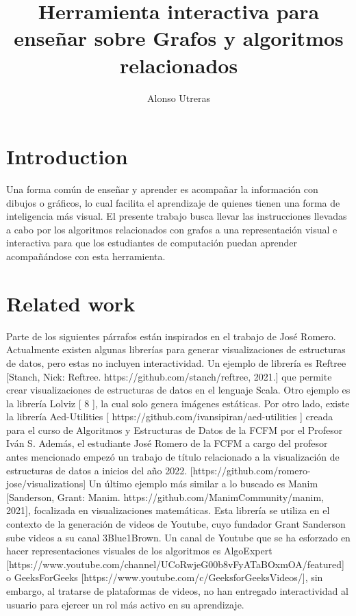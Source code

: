 \documentclass[submission]{eptcs}
\title{Herramienta interactiva para enseñar sobre Grafos y algoritmos relacionados}
\author{ Alonso Utreras
\institute{Department of Computer Science\\
University of Chile\\
Santiago, Chile}
\email{alonso.utreras@ug.uchile.cl}
\email{autreras@dcc.uchile.cl}
}
\begin{document}
\maketitle

\section{Introduction}
 
Una forma común de enseñar y aprender es acompañar la información con dibujos o gráficos, lo cual
facilita el aprendizaje de quienes tienen una forma de inteligencia más visual. El presente trabajo
busca llevar las instrucciones llevadas a cabo por los algoritmos relacionados con grafos a una
representación visual e interactiva para que los estudiantes de computación puedan aprender acompañándose
con esta herramienta.

\section{Related work}

Parte de los siguientes párrafos están inspirados en el trabajo de José Romero.
Actualmente existen algunas librerías para generar visualizaciones de estructuras de
datos, pero estas no incluyen interactividad. Un ejemplo de librería es Reftree [Stanch, Nick: Reftree.
https://github.com/stanch/reftree, 2021.] que permite crear visualizaciones de estructuras de datos en
el lenguaje Scala.
Otro ejemplo es la librería Lolviz [ 8 ], la cual solo genera imágenes estáticas.
Por otro lado, existe la librería Aed-Utilities [ https://github.com/ivansipiran/aed-utilities ] creada para el curso de Algoritmos
y Estructuras de Datos de la FCFM por el Profesor Iván S.
Además, el estudiante José Romero de la FCFM a cargo del profesor antes mencionado
empezó un trabajo de título relacionado a la visualización de estructuras de datos
a inicios del año 2022. [https://github.com/romero-jose/visualizations]
Un último ejemplo más similar a lo buscado es Manim [Sanderson, Grant: Manim. https://github.com/ManimCommunity/manim, 2021], focalizada en visualizaciones 
matemáticas. Esta librería se utiliza en el contexto de la generación de videos de Youtube,
cuyo fundador Grant Sanderson sube videos a su canal 3Blue1Brown.
Un canal de Youtube que se ha esforzado en hacer representaciones visuales de los algoritmos 
es AlgoExpert 
[https://www.youtube.com/channel/UCoRwjeG00b8vFyATaBOxmOA/featured] o
GeeksForGeeks 
[https://www.youtube.com/c/GeeksforGeeksVideos/], sin embargo,
al tratarse de plataformas de videos, no han entregado interactividad al usuario para
ejercer un rol más activo en su aprendizaje.
\end{document}
